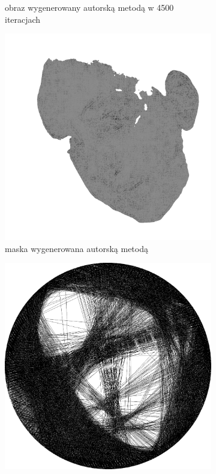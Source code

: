 \begin{figure}[H]
\begin{subfigure}{0.24\textwidth}
        \caption{obraz wygenerowany autorską metodą w 4500 iteracjach}
        \label{comp-comp-magdalene-g}
    \end{subfigure}
    \begin{subfigure}{0.24\textwidth}
        \centering
        \includegraphics[width = \textwidth]{img/6-comp/magdalene_mask_c20_inv0_bg1_obj10_ed10.png}
        \caption{maska wygenerowana autorską metodą}
        \label{comp-comp-magdalene-h}
    \end{subfigure}
    \begin{subfigure}{0.24\textwidth}
        \centering
        \includegraphics[width = \textwidth]{img/6-comp/magdalene_e_i3500_c20_inv0_bg1_obj2_ed1.png}

\end{subfigure}
\end{figure}
